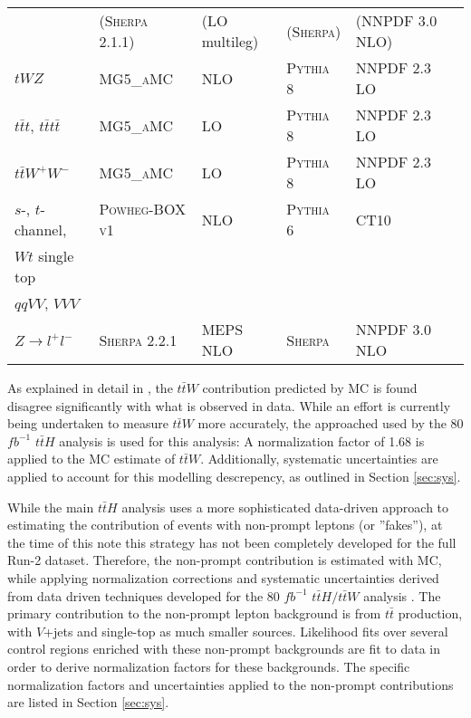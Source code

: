 \begin{table}[H]
\begin{center}
{\begin{tabular}{llllll}
& (\textsc{Sherpa} 2.1.1) & (LO multileg) & (\textsc{Sherpa}) & (NNPDF 3.0 NLO)  \\                                        
$t W Z$ & \textsc{MG5\_aMC} & NLO & \textsc{Pythia} 8 & NNPDF 2.3 LO   \\
$t\bar t t$, $t\bar t t\bar t$ & \textsc{MG5\_aMC} & LO & \textsc{Pythia} 8 & NNPDF 2.3 LO  \\                             
$t\bar t W^+ W^-$ & \textsc{MG5\_aMC} & LO & \textsc{Pythia} 8 & NNPDF 2.3 LO\\
$s$-, $t$-channel, & \textsc{Powheg-BOX v1} \cite{powhegstp}& NLO & \textsc{Pythia} 6 & CT10 \\
$Wt$ single top & & & &  \\
$qqVV$, $VVV$ & &   \\
$Z \to l^+l^-$ & \textsc{Sherpa} 2.2.1 & MEPS NLO  & \textsc{Sherpa} & NNPDF 3.0 NLO \\
\hline\hline
\end{tabular}
}
\end{center}
\end{table}

As explained in detail in \cite{ttH_paper}, the $t\bar{t}W$ contribution predicted by MC is found disagree significantly with what is observed in data. While an effort is currently being undertaken to measure $t\bar{t}W$ more accurately, the approached used by the 80 $fb^{-1}$ $t\bar{t}H$ analysis is used for this analysis: A normalization factor of 1.68 is applied to the MC estimate of $t\bar{t}W$. Additionally, systematic uncertainties are applied to account for this modelling descrepency, as outlined in Section \ref{sec:sys}.

While the main $t\bar{t}H$ analysis uses a more sophisticated data-driven approach to estimating the contribution of events with non-prompt leptons (or ''fakes''), at the time of this note this strategy has not been completely developed for the full Run-2 dataset. Therefore, the non-prompt contribution is estimated with MC, while applying normalization corrections and systematic uncertainties derived from data driven techniques developed for the 80 $fb^{-1}$ $t\bar{t}H/t\bar{t}W$ analysis \cite{ttH_paper}. The primary contribution to the non-prompt lepton background is from $t\bar{t}$ production, with $V$+jets and single-top as much smaller sources. Likelihood fits over several control regions enriched with these non-prompt backgrounds are fit to data in order to derive normalization factors for these backgrounds. The specific normalization factors and uncertainties applied to the non-prompt contributions are listed in Section \ref{sec:sys}.

